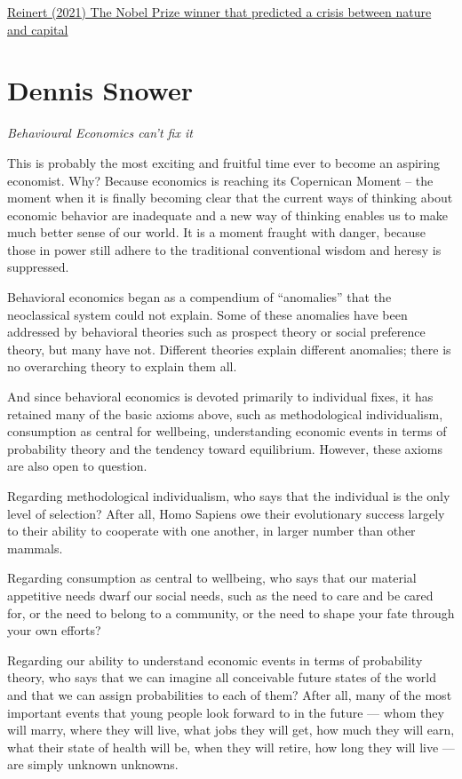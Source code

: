 \documentclass[
]{book}
\begin{document}
\href{https://developingeconomics.org/2021/12/27/the-nobel-prize-winner-that-predicted-a-crisis-between-nature-and-capital/}{Reinert (2021) The Nobel Prize winner that predicted a crisis between nature and capital}

\hypertarget{dennis-snower}{%
\section{Dennis Snower}\label{dennis-snower}}

\emph{Behavioural Economics can't fix it}

This is probably the most exciting and fruitful time ever to become an aspiring economist. Why? Because economics is reaching its Copernican Moment -- the moment when it is finally becoming clear that the current ways of thinking about economic behavior are inadequate and a new way of thinking enables us to make much better sense of our world. It is a moment fraught with danger, because those in power still adhere to the traditional conventional wisdom and heresy is suppressed.

Behavioral economics began as a compendium of ``anomalies'' that the neoclassical system could not explain. Some of these anomalies have been addressed by behavioral theories such as prospect theory or social preference theory, but many have not. Different theories explain different anomalies; there is no overarching theory to explain them all.

And since behavioral economics is devoted primarily to individual fixes, it has retained many of the basic axioms above, such as methodological individualism, consumption as central for wellbeing, understanding economic events in terms of probability theory and the tendency toward equilibrium. However, these axioms are also open to question.

Regarding methodological individualism, who says that the individual is the only level of selection? After all, Homo Sapiens owe their evolutionary success largely to their ability to cooperate with one another, in larger number than other mammals.

Regarding consumption as central to wellbeing, who says that our material appetitive needs dwarf our social needs, such as the need to care and be cared for, or the need to belong to a community, or the need to shape your fate through your own efforts?

Regarding our ability to understand economic events in terms of probability theory, who says that we can imagine all conceivable future states of the world and that we can assign probabilities to each of them? After all, many of the most important events that young people look forward to in the future --- whom they will marry, where they will live, what jobs they will get, how much they will earn, what their state of health will be, when they will retire, how long they will live --- are simply unknown unknowns.
\end{document}
